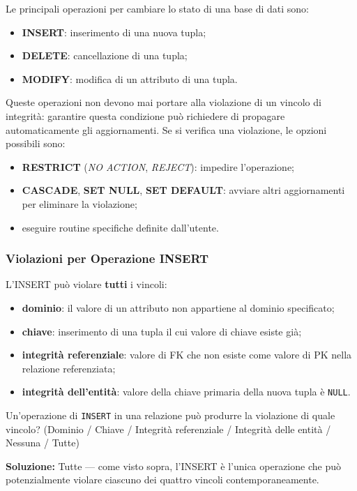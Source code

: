\documentclass[12pt, a4paper]{article}
\begin{document}
Le principali operazioni per cambiare lo stato di una base di dati sono:
\begin{itemize}
    \item \textbf{INSERT}: inserimento di una nuova tupla;
    \item \textbf{DELETE}: cancellazione di una tupla;
    \item \textbf{MODIFY}: modifica di un attributo di una tupla.
\end{itemize}
Queste operazioni non devono mai portare alla violazione di un vincolo di integrità: garantire questa condizione può richiedere di propagare automaticamente gli aggiornamenti. Se si verifica una violazione, le opzioni possibili sono:
\begin{itemize}
    \item \textbf{RESTRICT} (\textit{NO ACTION}, \textit{REJECT}): impedire l'operazione;
    \item \textbf{CASCADE}, \textbf{SET NULL}, \textbf{SET DEFAULT}: avviare altri aggiornamenti per eliminare la violazione;
    \item eseguire routine specifiche definite dall'utente.
\end{itemize}

\subsubsection{Violazioni per Operazione INSERT}

L'INSERT può violare \textbf{tutti} i vincoli:
\begin{itemize}
    \item \textbf{dominio}: il valore di un attributo non appartiene al dominio specificato;
    \item \textbf{chiave}: inserimento di una tupla il cui valore di chiave esiste già;
    \item \textbf{integrità referenziale}: valore di FK che non esiste come valore di PK nella relazione referenziata;
    \item \textbf{integrità dell'entità}: valore della chiave primaria della nuova tupla è \texttt{NULL}.
\end{itemize}

\begin{tcolorbox}[colback=lightergray!10, colframe=tocsec, title=\textbf{Esercizio 2}]
Un'operazione di \texttt{INSERT} in una relazione può produrre la violazione di quale vincolo? (Dominio / Chiave / Integrità referenziale / Integrità delle entità / Nessuna / Tutte)
\end{tcolorbox}
\textbf{Soluzione:} Tutte — come visto sopra, l'INSERT è l'unica operazione che può potenzialmente violare ciascuno dei quattro vincoli contemporaneamente.
\end{document}
